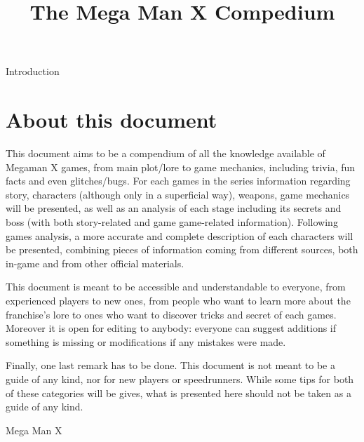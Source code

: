 \documentclass[openany]{report}
\title{The Mega Man X Compedium}
\begin{document}
\maketitle
\tableofcontents

\begin{chapter}{Introduction}
	\section{About this document}
	This document aims to be a compendium of all the knowledge available of Megaman X games, from main plot/lore to game mechanics, including trivia, fun facts and even glitches/bugs. For each games in the series information regarding story, characters (although only in a superficial way), weapons, game mechanics will be presented, as well as an analysis of each stage including its secrets and boss (with both story-related and game game-related information). Following games analysis, a more accurate and complete description of each characters will be presented, combining pieces of information coming from different sources, both in-game and from other official materials.
	
	This document is meant to be accessible and understandable to everyone, from experienced players to new ones, from people who want to learn more about the franchise's lore to ones who want to discover tricks and secret of each games. Moreover it is open for editing to anybody: everyone can suggest additions if something is missing or modifications if any mistakes were made.
	
	Finally, one last remark has to be done. This document is not meant to be a guide of any kind, nor for new players or speedrunners. While some tips for both of these categories will be gives, what is presented here should not be taken as a guide of any kind.
\end{chapter}

\begin{chapter}{Mega Man X}
	
\end{chapter}

 

\end{document}
